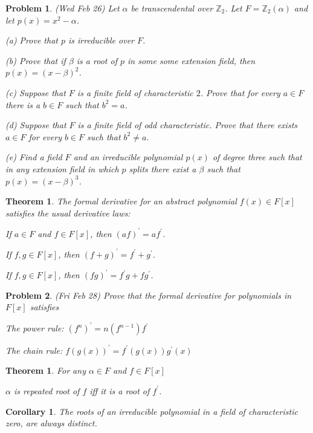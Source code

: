 \documentclass[12pt]{article}
\def\al{\alpha}
\def\be{\beta}
\def\zz{{\mathbb Z}}
\def\al{\alpha}
\def\be{\beta}
\def\pr{^\prime}
\newtheorem{thm}[theorem]{Theorem}
\newtheorem{cor}[theorem]{Corollary}
\newtheorem{prob}{Problem}
\newenvironment{enum}
{\begin{list}{(\alph{enumi})}
{\usecounter{enumi}\setlength{\rightmargin}{\leftmargin}}}
{\end{list}}
\begin{document}
\begin{prob}
(Wed Feb 26) Let $\al$ be transcendental over $\zz_2$.  Let
$F=\zz_2(\al)$ and let $p(x)=x^2-\al$.  
\par (a) Prove that $p$ is irreducible over $F$.
\par (b) Prove that if $\be$ is a root of $p$ in some
some extension field, then $p(x)=(x-\be)^2$.
\par (c) Suppose that $F$ is a finite field of characteristic $2$.
Prove that for every $a\in F$ there is a $b\in F$ such that $b^2=a$.
\par (d)  Suppose that $F$ is a finite field of odd characteristic.
Prove that there exists $a\in F$ for every $b\in F$ such that $b^2\neq a$.
\par (e) Find a field $F$ and an irreducible polynomial $p(x)$ of
degree three such that in any extension field in which $p$ splits
there exist a $\be$ such that $p(x)=(x-\be)^3$.
\end{prob}

\begin{thm}
The formal derivative for an abstract polynomial $f(x)\in F[x]$ satisfies
the usual derivative laws:
\begin{enum}
\item If $a\in F$ and $f\in F[x]$, then $(af)\pr=af\pr$.
\item If $f,g\in F[x]$, then $(f+g)\pr=f\pr+g\pr$.
\item If $f,g\in F[x]$, then $(fg)\pr=f\pr g+fg\pr$.
\end{enum}
\end{thm}

\begin{prob}
(Fri Feb 28) Prove that the formal derivative for polynomials
in $F[x]$ satisfies 
\begin{enum}
\item The power rule: $(f^n)\pr =n(f^{n-1})f\pr$
\item The chain rule: $f(g(x))\pr=f\pr(g(x))g\pr(x)$
\end{enum}
\end{prob}

\begin{thm}
For any $\al\in F$ and $f\in F[x]$ $\;\;\;\;$
\par $\al$ is repeated root of $f$ iff it is a root of $f\pr$.
\end{thm}

\begin{cor}
The roots of an irreducible polynomial in a field of characteristic
zero, are always distinct.
\end{cor}
\end{document}
